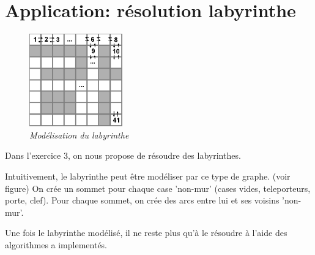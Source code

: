 \documentclass[10pt]{article}
\begin{document}
	\section{Application: résolution labyrinthe}
	
		\begin{figure}
			\includegraphics[height=4.0cm]{./images/lab.png}
			\caption{\textit{Modélisation du labyrinthe}}
		\end{figure}
		
		Dans l'exercice 3, on nous propose de résoudre des labyrinthes.\newline
		
		Intuitivement, le labyrinthe peut être modéliser par ce type de graphe. (voir figure)
		On crée un sommet pour chaque case 'non-mur' (cases vides, teleporteurs, porte, clef).
		Pour chaque sommet, on crée des arcs entre lui et ses voisins 'non-mur'.\newline
		
		Une fois le labyrinthe modélisé, il ne reste plus qu'à le résoudre à l'aide des algorithmes a implementés.\newline
		
\end{document}
